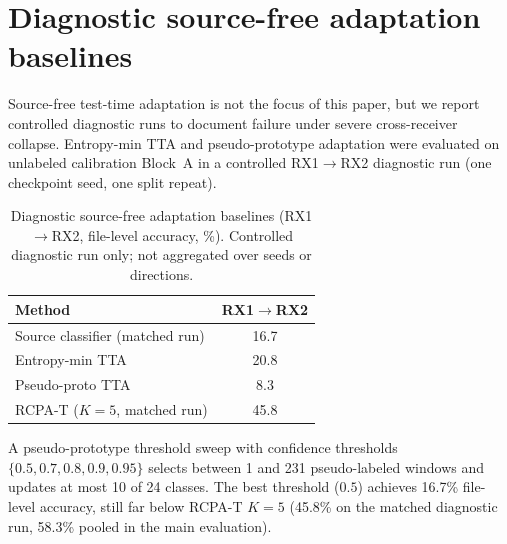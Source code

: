 \appendix
\section{Diagnostic source-free adaptation baselines}
\label{app:tta_diagnostic}

Source-free test-time adaptation is not the focus of this paper, but we report controlled diagnostic runs to document failure under severe cross-receiver collapse.
Entropy-min TTA and pseudo-prototype adaptation were evaluated on unlabeled calibration Block~A in a controlled RX1$\rightarrow$RX2 diagnostic run (one checkpoint seed, one split repeat).

\begin{table}[!t]
\caption{Diagnostic source-free adaptation baselines (RX1$\rightarrow$RX2, file-level accuracy, \%). Controlled diagnostic run only; not aggregated over seeds or directions.}
\label{tab:tta_diagnostic}
\centering
\small
\begin{tabular}{lc}
\toprule
Method & RX1$\rightarrow$RX2 \\
\midrule
Source classifier (matched run) & 16.7 \\
Entropy-min TTA & 20.8 \\
Pseudo-proto TTA & 8.3 \\
RCPA-T ($K{=}5$, matched run) & 45.8 \\
\bottomrule
\end{tabular}
\end{table}

A pseudo-prototype threshold sweep with confidence thresholds $\{0.5,0.7,0.8,0.9,0.95\}$ selects between 1 and 231 pseudo-labeled windows and updates at most 10 of 24 classes.
The best threshold ($0.5$) achieves 16.7\% file-level accuracy, still far below RCPA-T $K{=}5$ (45.8\% on the matched diagnostic run, 58.3\% pooled in the main evaluation).
